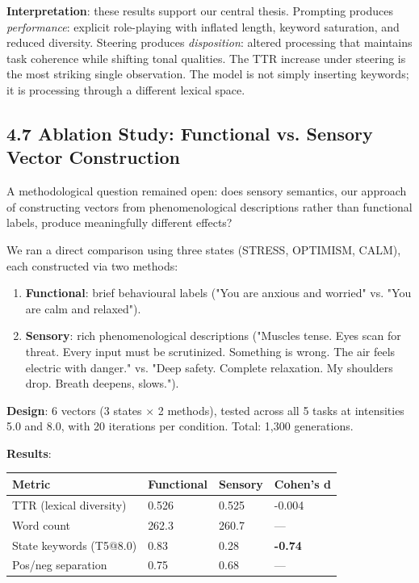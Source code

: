 \documentclass[11pt,a4paper]{article}
\begin{document}
\textbf{Interpretation}: these results support our central thesis. Prompting produces \emph{performance}: explicit role-playing with inflated length, keyword saturation, and reduced diversity. Steering produces \emph{disposition}: altered processing that maintains task coherence while shifting tonal qualities. The TTR increase under steering is the most striking single observation. The model is not simply inserting keywords; it is processing through a different lexical space.

\subsection*{4.7 Ablation Study: Functional vs. Sensory Vector Construction}

A methodological question remained open: does sensory semantics, our approach of constructing vectors from phenomenological descriptions rather than functional labels, produce meaningfully different effects?

We ran a direct comparison using three states (STRESS, OPTIMISM, CALM), each constructed via two methods:

\begin{enumerate}[leftmargin=*]
  \item \textbf{Functional}: brief behavioural labels ("You are anxious and worried" vs. "You are calm and relaxed").
  \item \textbf{Sensory}: rich phenomenological descriptions ("Muscles tense. Eyes scan for threat. Every input must be scrutinized. Something is wrong. The air feels electric with danger." vs. "Deep safety. Complete relaxation. My shoulders drop. Breath deepens, slows.").
\end{enumerate}

\textbf{Design}: 6 vectors (3 states \ensuremath{\times} 2 methods), tested across all 5 tasks at intensities 5.0 and 8.0, with 20 iterations per condition. Total: 1,300 generations.

\textbf{Results}:

\begin{center}
\begin{tabular}{llll}
\toprule
Metric & Functional & Sensory & Cohen's d \\
\midrule
TTR (lexical diversity) & 0.526 & 0.525 & -0.004 \\
Word count & 262.3 & 260.7 & --- \\
State keywords (T5@8.0) & 0.83 & 0.28 & \textbf{-0.74} \\
Pos/neg separation & 0.75 & 0.68 & --- \\
\bottomrule
\end{tabular}
\end{center}
\end{document}
